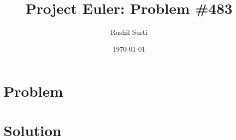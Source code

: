 \documentclass{article}
\title{Project Euler: Problem \#483}
\author{Rushil Surti}
\date{\today}
\begin{document}


\section{Problem}




\section{Solution}




\end{document}

